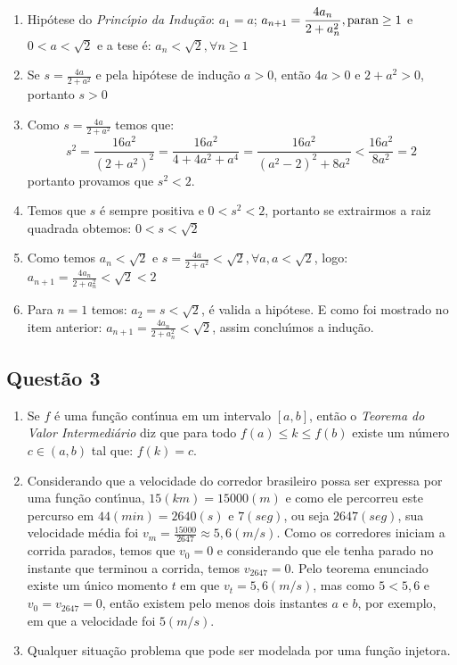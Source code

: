 \documentclass{report}
\begin{document}
\begin{enumerate}

\item[(a)] Hip\'otese do {\it Princ\'\i pio da Indu\c c\~ao}: $a_1=a$; $\displaystyle a_{n+1}  = \frac{4a_n}{2+a_n^2}, \rm{para } n\geq 1$ e $0<a<\sqrt{2}$ e a tese \'e: $a_n<\sqrt{2}, \forall n\geq 1$

\item[(b)] Se $\displaystyle s=\frac{4a}{2+a^2}$ e pela hip\'otese de indu\c c\~ao $a>0$, ent\~ao $4a>0$ e $2+a^2>0$, portanto $s>0$

\item[(c)] Como $\displaystyle s=\frac{4a}{2+a^2}$ temos que: $$s^2=\frac{16a^2}{(2+a^2)^2}=\frac{16a^2}{4+4a^2+a^4}=\frac{16a^2}{(a^2-2)^2+8a^2}<\frac{16a^2}{8a^2}=2$$ portanto provamos que $s^2<2$.

\item[(d)] Temos que $s$ \'e sempre positiva e $0<s^2<2$, portanto se extrairmos a raiz quadrada obtemos: $0<s<\sqrt{2}$

\item[(e)] Como temos $a_n<\sqrt 2$ e $s=\displaystyle \frac{4a}{2+a^2}<\sqrt 2, \forall a, a<\sqrt 2$, logo: $a_{n+1}=\displaystyle \frac{4a_n}{2+a_n^2}<\sqrt 2<2$

\item[(f)] Para $n=1$ temos: $a_2=s<\sqrt 2$, \'e valida a hip\'otese. E como foi mostrado no item anterior: $a_{n+1}=\displaystyle \frac{4a_n}{2+a_n^2}<\sqrt 2$, assim conclu\'\i mos a indu\c c\~ao.

\end{enumerate}

\subsection{\color{red} Quest\~ao 3}

\begin{enumerate}

\item[(a)] Se $f$ \'e uma fun\c c\~ao cont\'\i nua em um intervalo $[a,b]$, ent\~ao o {\it Teorema do Valor Intermedi\'ario} diz que para todo $f(a)\leq k \leq f(b)$ existe um n\'umero $c\in (a,b)$ tal que: $f(k)=c$. 

\item[(b)] Considerando que a velocidade do corredor brasileiro possa ser expressa por uma fun\c c\~ao cont\'\i nua, $15 (km)= 15000 (m)$ e como ele percorreu este percurso em $44 (min)= 2640 (s)$ e $7 (seg)$, ou seja $2647 (seg)$, sua velocidade m\'edia foi $\displaystyle v_m= \frac{15000}{2647}\approx 5,6 (m/s)$. Como os corredores iniciam a corrida parados, temos que $v_0=0$ e considerando que ele tenha parado no instante que terminou a corrida, temos $v_{2647}=0$. Pelo teorema enunciado existe um \'unico momento $t$ em que $v_t=5,6 (m/s)$, mas como $5<5,6$ e $v_0=v_{2647}=0$, ent\~ao existem pelo menos dois instantes $a$ e $b$, por exemplo, em que a velocidade foi $5 (m/s)$.

\item[(c)] Qualquer situa\c c\~ao problema que pode ser modelada por uma fun\c c\~ao injetora.

\end{enumerate}
\end{document}
